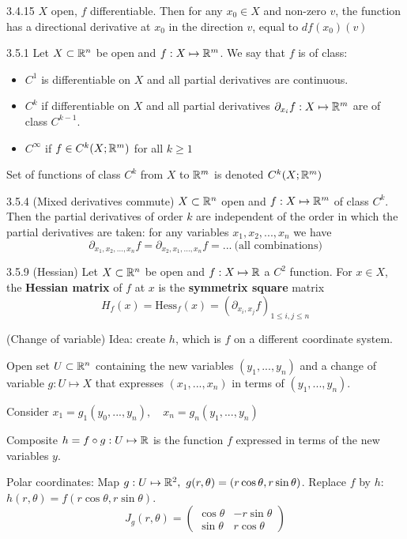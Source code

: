 \begin{proposition}{3.4.15}
    $X$ open, $f$ differentiable. Then for any $x_0 \in X$ and non-zero $v$, the function has
    a directional derivative at $x_0$ in the direction $v$, equal to $df(x_0)(v)$
\end{proposition}

\begin{definition}{3.5.1}
    Let $X \subset \mathbb{R}^n$ be open and $f: X \mapsto \mathbb{R}^m$.
    We say that $f$ is of class:
    \begin{itemize}
        \item $C^1$ is differentiable on $X$ and all partial derivatives are continuous.
        \item $C^k$ if differentiable on $X$ and all partial derivatives $\partial_{x_i}f: X \mapsto \mathbb{R}^m$ are of class $C^{k-1}$.
        \item $C^\infty$ if $f \in C^k(X;\mathbb{R}^m)$ for all $k \ge 1$
    \end{itemize}
    Set of functions of class $C^k$ from $X$ to $\mathbb{R}^m$ is denoted $C^k(X; \mathbb{R}^m)$
\end{definition}

\begin{proposition}{3.5.4 (Mixed derivatives commute)}
    $X \subset \mathbb{R}^n$ open and $f: X \mapsto \mathbb{R}^m$ of class $C^k$. Then the partial derivatives
    of order $k$ are independent of the order in which the partial derivatives are taken: for any variables
    $x_1, x_2, ..., x_n$ we have
    \[ \partial_{x_1, x_2, ..., x_n}f = \partial_{x_2, x_1, ..., x_n}f = ...   \ \mbox{(all combinations)}\]
\end{proposition}

\begin{definition}{3.5.9 (Hessian)}
    Let $X \subset \mathbb{R}^n$ be open and $f: X \mapsto \mathbb{R}$ a $C^2$ function.
    For $x \in X$, the \textbf{Hessian matrix} of $f$ at $x$ is the \textbf{symmetrix square} matrix
    \[ \mathit{H}_f(x) = \mathrm{Hess}_f(x) = (\partial_{x_i, x_j}f)_{1 \le i, j \le n} \]
\end{definition}

\begin{example}{(Change of variable)}
    Idea: create $h$, which is $f$ on a different coordinate system.

    Open set $U \subset \mathbb{R}^n$ containing the new variables $(y_1, ..., y_n)$ and a change of variable $g: U \mapsto X$
    that expresses $(x_1, ..., x_n)$ in terms of $(y_1, ..., y_n)$.

    Consider $x_1 = g_1(y_0, ..., y_n),\quad x_n = g_n(y_1, ..., y_n)$

    Composite $h = f \circ g: U \mapsto \mathbb{R}$ is the function $f$ expressed in terms of the new variables $y$.

    Polar coordinates: Map $g: U \mapsto \R^2,\ g(r, \theta) = (r \cos \theta, r \sin \theta)$.
    Replace $f$ by $h$: $h(r, \theta) = f(r \cos \theta, r \sin \theta)$.
    \[ J_g(r, \theta) = \begin{pmatrix}
            \cos \theta & - r \sin \theta \\
            \sin \theta & r \cos \theta
        \end{pmatrix} \]
\end{example}

